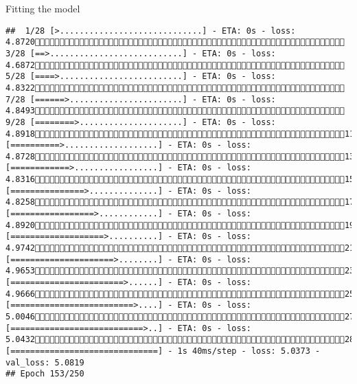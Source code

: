 \documentclass[
  ignorenonframetext,
]{beamer}
\begin{document}
\begin{frame}[fragile]{Fitting the model}
\begin{verbatim}
##  1/28 [>.............................] - ETA: 0s - loss: 4.8720 3/28 [==>...........................] - ETA: 0s - loss: 4.6872 5/28 [====>.........................] - ETA: 0s - loss: 4.8322 7/28 [======>.......................] - ETA: 0s - loss: 4.8493 9/28 [========>.....................] - ETA: 0s - loss: 4.891811/28 [==========>...................] - ETA: 0s - loss: 4.872813/28 [============>.................] - ETA: 0s - loss: 4.831615/28 [===============>..............] - ETA: 0s - loss: 4.825817/28 [=================>............] - ETA: 0s - loss: 4.892019/28 [===================>..........] - ETA: 0s - loss: 4.974221/28 [=====================>........] - ETA: 0s - loss: 4.965323/28 [=======================>......] - ETA: 0s - loss: 4.966625/28 [=========================>....] - ETA: 0s - loss: 5.004627/28 [===========================>..] - ETA: 0s - loss: 5.043228/28 [==============================] - 1s 40ms/step - loss: 5.0373 - val_loss: 5.0819
## Epoch 153/250

\end{verbatim}
\end{frame}
\end{document}
